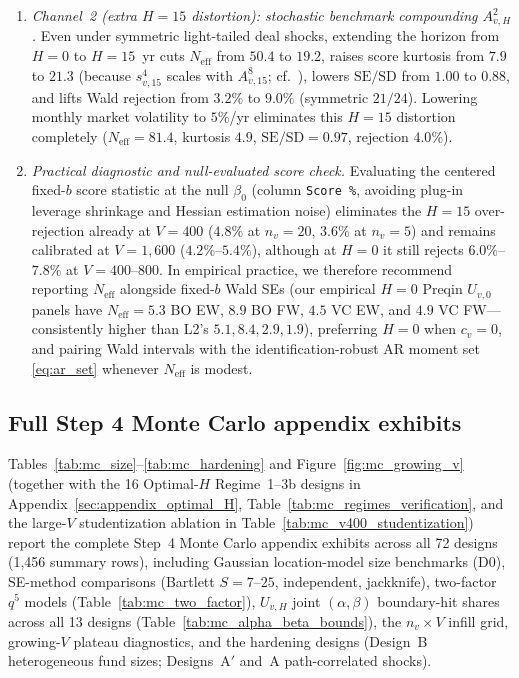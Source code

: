 \begin{enumerate}
  \item \emph{Channel~2 (extra $H=15$ distortion): stochastic benchmark compounding $A_{v,H}^2$.} Even under symmetric light-tailed deal shocks, extending the horizon from $H=0$ to $H=15$~yr cuts $N_{\mathrm{eff}}$ from $50.4$ to $19.2$, raises score kurtosis from $7.9$ to $21.3$ (because $s_{v,15}^4$ scales with $A_{v,15}^8$; cf.\ \citealp{Martin12}), lowers $\mathrm{SE}/\mathrm{SD}$ from $1.00$ to $0.88$, and lifts Wald rejection from $3.2\%$ to $9.0\%$ (symmetric $21/24$). Lowering monthly market volatility to $5\%$/yr eliminates this $H=15$ distortion completely ($N_{\mathrm{eff}} = 81.4$, kurtosis $4.9$, $\mathrm{SE}/\mathrm{SD}=0.97$, rejection $4.0\%$).
  \item \emph{Practical diagnostic and null-evaluated score check.} Evaluating the centered fixed-$b$ score statistic at the null $\beta_0$ (column \texttt{Score\,\%}, avoiding plug-in leverage shrinkage and Hessian estimation noise) eliminates the $H=15$ over-rejection already at $V=400$ ($4.8\%$ at $n_v=20$, $3.6\%$ at $n_v=5$) and remains calibrated at $V=1{,}600$ ($4.2\%$--$5.4\%$), although at $H=0$ it still rejects $6.0\%$--$7.8\%$ at $V=400$--$800$. In empirical practice, we therefore recommend reporting $N_{\mathrm{eff}}$ alongside fixed-$b$ Wald SEs (our empirical $H=0$ Preqin $U_{v,0}$ panels have $N_{\mathrm{eff}} = 5.3$ BO EW, $8.9$ BO FW, $4.5$ VC EW, and $4.9$ VC FW---consistently higher than L2's $5.1, 8.4, 2.9, 1.9$), preferring $H=0$ when $c_v=0$, and pairing Wald intervals with the identification-robust AR moment set \eqref{eq:ar_set} whenever $N_{\mathrm{eff}}$ is modest.
\end{enumerate}



\subsection{Full Step 4 Monte Carlo appendix exhibits}

Tables~\ref{tab:mc_size}--\ref{tab:mc_hardening} and Figure~\ref{fig:mc_growing_v} (together with the 16 Optimal-$H$ Regime~1--3b designs in Appendix~\ref{sec:appendix_optimal_H}, Table~\ref{tab:mc_regimes_verification}, and the large-$V$ studentization ablation in Table~\ref{tab:mc_v400_studentization}) report the complete Step~4 Monte Carlo appendix exhibits across all 72 designs (1,456 summary rows), including Gaussian location-model size benchmarks (D0), SE-method comparisons (Bartlett $S=7$--$25$, independent, jackknife), two-factor $q^5$ models (Table~\ref{tab:mc_two_factor}), $U_{v,H}$ joint $(\alpha,\beta)$ boundary-hit shares across all 13 designs (Table~\ref{tab:mc_alpha_beta_bounds}), the $n_v \times V$ infill grid, growing-$V$ plateau diagnostics, and the hardening designs (Design~B heterogeneous fund sizes; Designs~A$'$ and~A path-correlated shocks).

